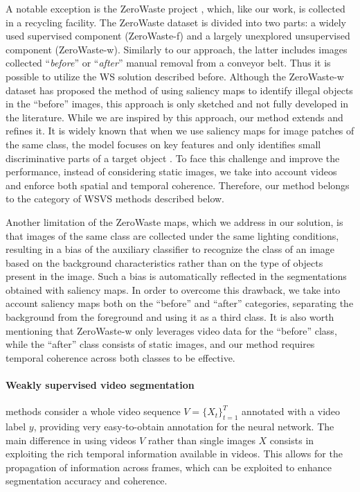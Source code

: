 A notable exception is the ZeroWaste project \cite{bashkirova2022zerowaste}, which, like our work, is collected in a recycling facility. The ZeroWaste dataset is divided into two parts: a widely used supervised component (ZeroWaste-f) and a largely unexplored unsupervised component (ZeroWaste-w). Similarly to our approach, the latter includes images collected “\textit{before}” or “\textit{after}” manual removal from a conveyor belt. Thus it is possible to utilize the WS solution described before. Although the ZeroWaste-w dataset has proposed the method of using saliency maps to identify illegal objects in the ``before'' images, this approach is only sketched and not fully developed in the literature. While we are inspired by this approach, our method extends and refines it. It is widely known that when we use saliency maps for image patches of the same class, the model focuses on key features and only identifies small discriminative parts of a target object \cite{huang2018weakly, wei2017object, zhang2018adversarial}.
%
To face this challenge and improve the performance, instead of considering static images, we take into account videos and enforce both spatial and temporal coherence. Therefore, our method belongs to the category of WSVS methods described below. 

Another limitation of the ZeroWaste maps, which we address in our solution, is that images of the same class are collected under the same lighting conditions, resulting in a bias of the auxiliary classifier to recognize the class of an image based on the background characteristics rather than on the type of objects present in the image. Such a bias is automatically reflected in the segmentations obtained with saliency maps. In order to overcome this drawback, we take into account saliency maps both on the ``before'' and ``after'' categories, separating the background from the foreground and using it as a third class. It is also worth mentioning that ZeroWaste-w only leverages video data for the ``before'' class, while the ``after'' class consists of static images, and our method requires temporal coherence across both classes to be effective.
\paragraph{Weakly supervised video segmentation} methods consider a whole video sequence \( V = \{X_t\}_{t=1}^T \) annotated with a video label $y$, providing very easy-to-obtain annotation for the neural network. The main difference in using videos $V$ rather than single images $X$ consists in exploiting the rich temporal information available in videos. This %
allows for the propagation of information across frames, which can be exploited to enhance segmentation accuracy and coherence.

